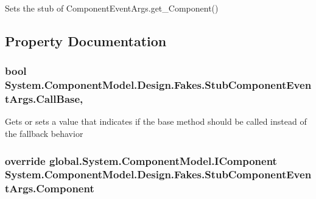 Sets the stub of Component\-Event\-Args.\-get\-\_\-\-Component()



\subsection{Property Documentation}
\hypertarget{class_system_1_1_component_model_1_1_design_1_1_fakes_1_1_stub_component_event_args_a615ddea49879ca24da8958ee125590ab}{
\subsubsection[{Call\-Base}]{\setlength{\rightskip}{0pt plus 5cm}bool System.\-Component\-Model.\-Design.\-Fakes.\-Stub\-Component\-Event\-Args.\-Call\-Base\hspace{0.3cm}{\ttfamily [get]}, {\ttfamily [set]}}}\label{class_system_1_1_component_model_1_1_design_1_1_fakes_1_1_stub_component_event_args_a615ddea49879ca24da8958ee125590ab}


Gets or sets a value that indicates if the base method should be called instead of the fallback behavior

\hypertarget{class_system_1_1_component_model_1_1_design_1_1_fakes_1_1_stub_component_event_args_af02afecd774ef5e649ec1d88c1852ad6}{
\subsubsection[{Component}]{\setlength{\rightskip}{0pt plus 5cm}override global.\-System.\-Component\-Model.\-I\-Component System.\-Component\-Model.\-Design.\-Fakes.\-Stub\-Component\-Event\-Args.\-Component\hspace{0.3cm}{\ttfamily [get]}}}\label{class_system_1_1_component_model_1_1_design_1_1_fakes_1_1_stub_component_event_args_af02afecd774ef5e649ec1d88c1852ad6}


